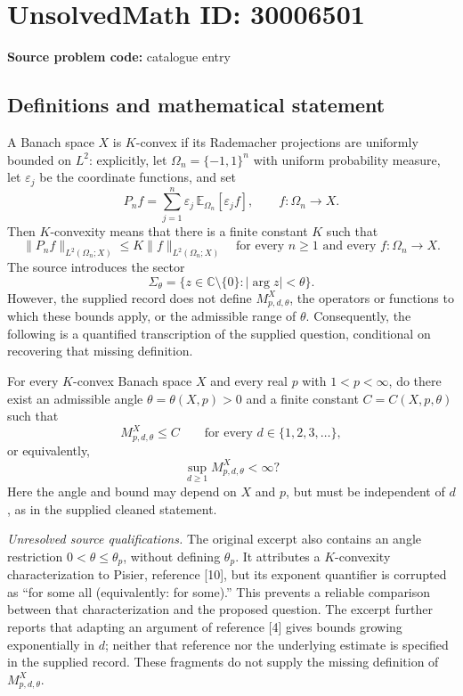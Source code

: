 \documentclass[11pt]{article}
\newcommand{\C}{\mathbb{C}}
\newcommand{\E}{\mathbb{E}}
\begin{document}
\section*{UnsolvedMath ID: 30006501}
\textbf{Source problem code:} catalogue entry
\subsection{Definitions and mathematical statement}
A Banach space \(X\) is \(K\)-convex if its Rademacher projections are uniformly bounded on \(L^2\): explicitly, let \(\Omega_n=\{-1,1\}^n\) with uniform probability measure, let \(\varepsilon_j\) be the coordinate functions, and set
\[
P_n f=\sum_{j=1}^n\varepsilon_j\,\E_{\Omega_n}[\varepsilon_j f],
\qquad f:\Omega_n\to X.
\]
Then \(K\)-convexity means that there is a finite constant \(K\) such that
\[
\|P_n f\|_{L^2(\Omega_n;X)}\le K\|f\|_{L^2(\Omega_n;X)}
\quad\text{for every }n\ge1\text{ and every }f:\Omega_n\to X.
\]
The source introduces the sector
\[
\Sigma_\theta=\{z\in\C\setminus\{0\}:|\arg z|<\theta\}.
\]
However, the supplied record does not define \(M_{p,d,\theta}^X\), the operators or functions to which these bounds apply, or the admissible range of \(\theta\). Consequently, the following is a quantified transcription of the supplied question, conditional on recovering that missing definition.

For every \(K\)-convex Banach space \(X\) and every real \(p\) with \(1<p<\infty\), do there exist an admissible angle \(\theta=\theta(X,p)>0\) and a finite constant \(C=C(X,p,\theta)\) such that
\[
M_{p,d,\theta}^X\le C
\qquad\text{for every }d\in\{1,2,3,\ldots\},
\]
or equivalently,
\[
\sup_{d\ge1}M_{p,d,\theta}^X<\infty?
\]
Here the angle and bound may depend on \(X\) and \(p\), but must be independent of \(d\), as in the supplied cleaned statement.

\emph{Unresolved source qualifications.} The original excerpt also contains an angle restriction \(0<\theta\le\theta_p\), without defining \(\theta_p\). It attributes a \(K\)-convexity characterization to Pisier, reference [10], but its exponent quantifier is corrupted as ``for some all (equivalently: for some).'' This prevents a reliable comparison between that characterization and the proposed question. The excerpt further reports that adapting an argument of reference [4] gives bounds growing exponentially in \(d\); neither that reference nor the underlying estimate is specified in the supplied record. These fragments do not supply the missing definition of \(M_{p,d,\theta}^X\).
\end{document}
